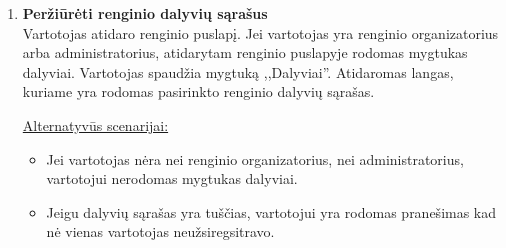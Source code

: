\documentclass{VUMIFPSkursinis}
\begin{document}
\begin{enumerate} [label = \textbf{U\arabic*.}]
					\underline{Alternatyvūs scenarijai:}
					\begin{itemize}
						\item Renginio organizatorius nesuveda visų privalomų laukų. Jam neleidžia paspausti mygtuko ,,Sukūrti renginį'' ir prie atitinkamų laukų rašoma klaida.
					\end{itemize}	
			
			\item \textbf{Peržiūrėti renginio dalyvių sąrašus}   \\
					Vartotojas atidaro renginio puslapį. Jei vartotojas yra renginio organizatorius arba administratorius, atidarytam renginio puslapyje rodomas mygtukas dalyviai. Vartotojas spaudžia mygtuką ,,Dalyviai''. Atidaromas langas, kuriame yra rodomas pasirinkto renginio dalyvių sąrašas.
					
					\underline{Alternatyvūs scenarijai:}
					\begin{itemize}
						\item Jei vartotojas nėra nei renginio organizatorius, nei administratorius, vartotojui nerodomas mygtukas dalyviai.
						\item Jeigu dalyvių sąrašas yra tuščias, vartotojui yra rodomas pranešimas kad nė vienas vartotojas neužsiregsitravo.
					\end{itemize}	
	
			\newpage	

\end{enumerate}
\end{document}
